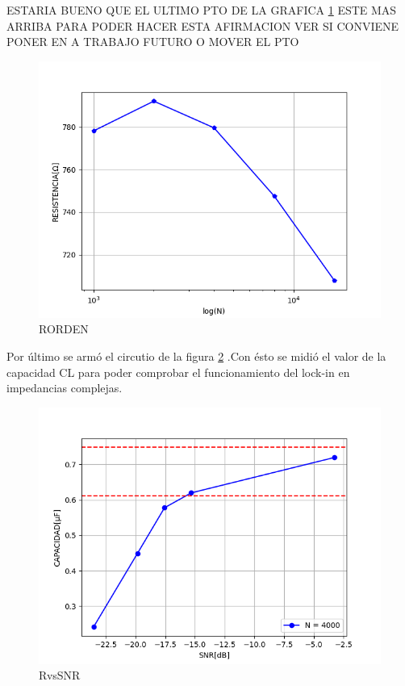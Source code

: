 \documentclass[11pt,a4paper]{extarticle}
\begin{document}
\begin{multicols}{2}
ESTARIA BUENO QUE EL ULTIMO PTO DE LA GRAFICA \ref{fig:RORDEN}
ESTE MAS ARRIBA PARA PODER HACER ESTA AFIRMACION 
VER SI CONVIENE PONER EN A TRABAJO FUTURO O MOVER EL PTO\\

\begin{figure}[H]
	\centering
	\includegraphics[width=\linewidth]{Images/RORDEN.png}
	\caption{RORDEN}
	\label{fig:RORDEN}
\end{figure}

Por último se armó el circutio de la figura 
\ref{fig:CvsSNR} .Con ésto 
se midió el valor de la capacidad CL para poder 
comprobar el funcionamiento del lock-in en 
impedancias complejas.

\begin{figure}[H]
	\centering
	\includegraphics[width=\linewidth]{Images/CvsSNR(segunda).png}
	\caption{RvsSNR}
	\label{fig:CvsSNR}
\end{figure}



\end{multicols}
\end{document}
